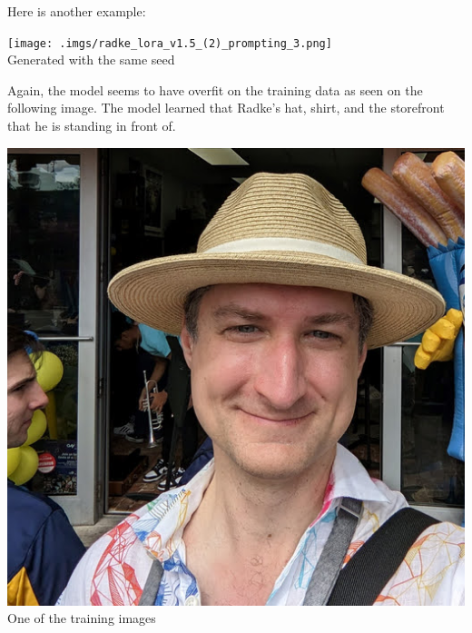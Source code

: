 \documentclass{article}
\begin{document}
\newpage
\noindent Here is another example:
\begin{center}
    \texttt{[image: .imgs/radke\_lora\_v1.5\_(2)\_prompting\_3.png]} \\
    Generated with the same seed
\end{center}
Again, the model seems to have overfit on the training data as seen on the following image. The model learned that Radke's hat, shirt, and the storefront that he is standing in front of.
\begin{center}
    \includegraphics[scale=0.2]{.imgs/radke_overfitting_3.jpg} \\
    One of the training images
\end{center}
\end{document}
